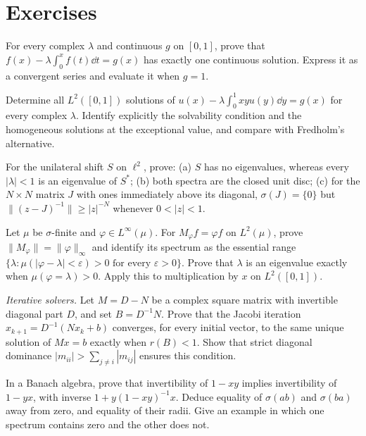 \section{Exercises}

\begin{exercise}[$\star$]\label{ex:volterraeq}
For every complex $\lambda$ and continuous $g$ on $[0,1]$, prove that $f(x)-\lambda\int_0^xf(t)\dd t=g(x)$ has exactly one continuous solution. Express it as a convergent series and evaluate it when $g=1$.
\end{exercise}
\begin{exercise}[$\star$]\label{ex:fredholmrank1}
Determine all $L^2([0,1])$ solutions of $u(x)-\lambda\int_0^1xyu(y)\dd y=g(x)$ for every complex $\lambda$. Identify explicitly the solvability condition and the homogeneous solutions at the exceptional value, and compare with Fredholm's alternative.
\end{exercise}
\begin{exercise}[$\star\star$]\label{ex:shift}
For the unilateral shift $S$ on $\ell^2$, prove:
(a) $S$ has no eigenvalues, whereas every $|\lambda|<1$ is an eigenvalue of $S^*$;
(b) both spectra are the closed unit disc;
(c) for the $N\times N$ matrix $J$ with ones immediately above its diagonal, $\sigma(J)=\{0\}$ but $\|(z-J)^{-1}\|\ge|z|^{-N}$ whenever $0<|z|<1$.
\end{exercise}
\begin{exercise}[$\star\star$]\label{ex:multiplication}
Let $\mu$ be $\sigma$-finite and $\varphi\in L^\infty(\mu)$. For $M_\varphi f=\varphi f$ on $L^2(\mu)$, prove $\|M_\varphi\|=\|\varphi\|_\infty$ and identify its spectrum as the essential range
$\{\lambda:\mu(|\varphi-\lambda|<\varepsilon)>0\text{ for every }\varepsilon>0\}$.
Prove that $\lambda$ is an eigenvalue exactly when $\mu(\varphi=\lambda)>0$. Apply this to multiplication by $x$ on $L^2([0,1])$.
\end{exercise}
\begin{exercise}[$\star$]\label{ex:jacobi}
\emph{Iterative solvers.} Let $M=D-N$ be a complex square matrix with invertible diagonal part $D$, and set $B=D^{-1}N$. Prove that the Jacobi iteration $x_{k+1}=D^{-1}(Nx_k+b)$ converges, for every initial vector, to the same unique solution of $Mx=b$ exactly when $r(B)<1$. Show that strict diagonal dominance $|m_{ii}|>\sum_{j\ne i}|m_{ij}|$ ensures this condition.
\end{exercise}
\begin{exercise}[$\star\star$]\label{ex:jacobson}
In a Banach algebra, prove that invertibility of $1-xy$ implies invertibility of $1-yx$, with inverse $1+y(1-xy)^{-1}x$. Deduce equality of $\sigma(ab)$ and $\sigma(ba)$ away from zero, and equality of their radii. Give an example in which one spectrum contains zero and the other does not.
\end{exercise}
